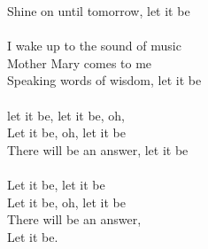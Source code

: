 \begin{multicols}{2}
Shine on until tomorrow, let it be\\
\\
I wake up to the sound of music\\
Mother Mary comes to me\\
Speaking words of wisdom, let it be\\
\\
let it be, let it be, oh,\\
Let it be, oh, let it be\\
There will be an answer, let it be\\
\\
Let it be, let it be\\
Let it be, oh, let it be\\
There will be an answer,\\
Let it be.\\
\end{multicols}